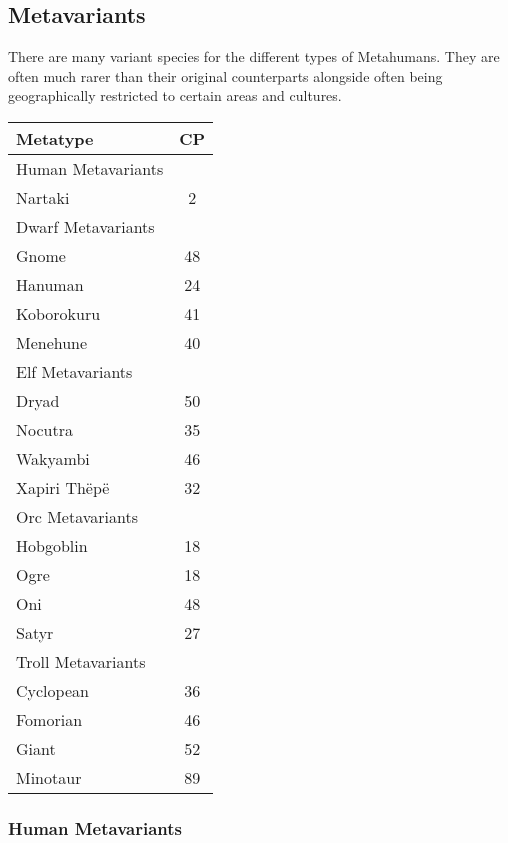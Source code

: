 \begin{multicols*}{3}
	
	\subsection{Metavariants}
	
	There are many variant species for the different types of Metahumans. They are often much rarer than their original counterparts alongside often being geographically restricted to certain areas and cultures.
	
	\begin{center}
		\begin{tabularx}{0.32\textwidth}{|X|c|}
			\hline
			Metatype & CP \\
			\hline
			\hline
			Human Metavariants & \\
			\hline
			Nartaki & 2 \\
			\hline
			\hline
			Dwarf Metavariants & \\
			\hline
			Gnome & 48 \\
			Hanuman & 24 \\
			Koborokuru & 41 \\
			Menehune & 40 \\
			\hline
			\hline
			Elf Metavariants & \\
			\hline
			Dryad & 50 \\
			Nocutra & 35 \\
			Wakyambi & 46 \\
			Xapiri Thëpë & 32 \\
			\hline
			\hline
			Orc Metavariants & \\
			\hline
			Hobgoblin & 18 \\
			Ogre & 18 \\
			Oni & 48 \\
			Satyr & 27 \\
			\hline
			\hline
			Troll Metavariants & \\
			\hline
			Cyclopean & 36 \\
			Fomorian & 46 \\
			Giant & 52 \\
			Minotaur & 89 \\
			\hline
		\end{tabularx}
	\end{center}
	
	\subsubsection{Human Metavariants}
	

\end{multicols*}
